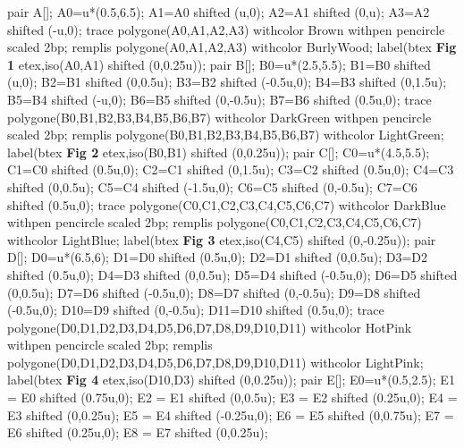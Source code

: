 \begin{exercice*}
    \begin{Geometrie}[CoinHD={(8u,8u)}]
        pair A[];
        A0=u*(0.5,6.5);
        A1=A0 shifted (u,0);
        A2=A1 shifted (0,u);
        A3=A2 shifted (-u,0);
        trace polygone(A0,A1,A2,A3) withcolor Brown withpen pencircle scaled 2bp;
        remplis polygone(A0,A1,A2,A3) withcolor BurlyWood;
        label(btex {\bfseries Fig 1} etex,iso(A0,A1) shifted (0,0.25u));
        pair B[];
        B0=u*(2.5,5.5);
        B1=B0 shifted (u,0);
        B2=B1 shifted (0,0.5u);
        B3=B2 shifted (-0.5u,0);
        B4=B3 shifted (0,1.5u);
        B5=B4 shifted (-u,0);
        B6=B5 shifted (0,-0.5u);
        B7=B6 shifted (0.5u,0);
        trace polygone(B0,B1,B2,B3,B4,B5,B6,B7) withcolor DarkGreen withpen pencircle scaled 2bp;
        remplis polygone(B0,B1,B2,B3,B4,B5,B6,B7) withcolor LightGreen;
        label(btex {\bfseries Fig 2} etex,iso(B0,B1) shifted (0,0.25u));
        pair C[];
        C0=u*(4.5,5.5);
        C1=C0 shifted (0.5u,0);
        C2=C1 shifted (0,1.5u);
        C3=C2 shifted (0.5u,0);
        C4=C3 shifted (0,0.5u);
        C5=C4 shifted (-1.5u,0);
        C6=C5 shifted (0,-0.5u);
        C7=C6 shifted (0.5u,0);
        trace polygone(C0,C1,C2,C3,C4,C5,C6,C7) withcolor DarkBlue withpen pencircle scaled 2bp;
        remplis polygone(C0,C1,C2,C3,C4,C5,C6,C7) withcolor LightBlue;            
        label(btex {\bfseries Fig 3} etex,iso(C4,C5) shifted (0,-0.25u));
        pair D[];
        D0=u*(6.5,6);
        D1=D0 shifted (0.5u,0);
        D2=D1 shifted (0,0.5u);
        D3=D2 shifted (0.5u,0);
        D4=D3 shifted (0,0.5u);
        D5=D4 shifted (-0.5u,0);
        D6=D5 shifted (0,0.5u);
        D7=D6  shifted (-0.5u,0);
        D8=D7  shifted (0,-0.5u);
        D9=D8  shifted (-0.5u,0);
        D10=D9  shifted (0,-0.5u);
        D11=D10 shifted (0.5u,0);        
        trace   polygone(D0,D1,D2,D3,D4,D5,D6,D7,D8,D9,D10,D11) withcolor HotPink withpen pencircle scaled 2bp;
        remplis polygone(D0,D1,D2,D3,D4,D5,D6,D7,D8,D9,D10,D11) withcolor LightPink;            
        label(btex {\bfseries Fig 4} etex,iso(D10,D3) shifted (0,0.25u));
        pair E[];
        E0=u*(0.5,2.5);
        E1 = E0  shifted (0.75u,0);
        E2 = E1  shifted (0,0.5u);
        E3 = E2  shifted (0.25u,0);
        E4 = E3  shifted (0,0.25u);
        E5 = E4  shifted (-0.25u,0);
        E6 = E5  shifted (0,0.75u);
        E7 = E6  shifted (0.25u,0);
        E8 = E7  shifted (0,0.25u);

\end{Geometrie}
\end{exercice*}
